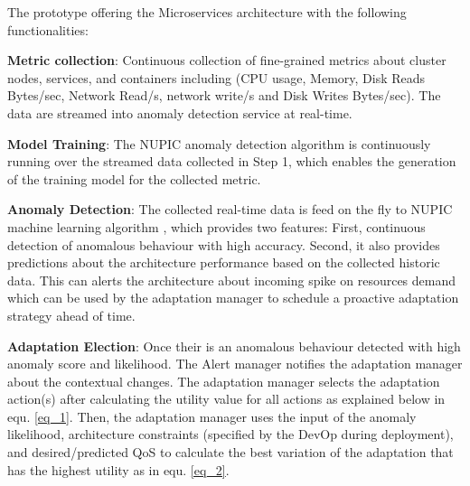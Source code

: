 \documentclass[sigconf]{acmart}
\begin{document}
The prototype offering the Microservices architecture with the following functionalities: 

\textbf{Metric collection}: Continuous collection of fine-grained metrics about cluster nodes, services, and containers including (CPU usage, Memory, Disk Reads Bytes/sec, Network Read/s, network write/s and Disk Writes Bytes/sec). The data are streamed into anomaly detection service at real-time. 

\textbf{Model Training}: The NUPIC anomaly detection algorithm is continuously running over the streamed data collected in Step 1, which enables the generation of the training model for the collected metric. 

\textbf{Anomaly Detection}: The collected real-time data is feed on the fly to NUPIC machine learning algorithm \cite{AHMAD2017134}, which provides two features: First, continuous detection of anomalous behaviour with high accuracy. Second, it also provides predictions about the architecture performance based on the collected historic data. This can alerts the architecture about incoming spike on resources demand which can be used by the adaptation manager to schedule a proactive adaptation strategy ahead of time. 

\textbf{Adaptation Election}: Once their is an anomalous behaviour detected with high anomaly score and likelihood. The Alert manager notifies the adaptation manager about the contextual changes. The adaptation manager selects the adaptation action(s) after calculating the utility value for all actions as explained below in equ. \ref{eq_1}. Then, the adaptation manager uses the input of the anomaly likelihood, architecture constraints (specified by the DevOp during deployment), and desired/predicted QoS to calculate the best variation of the adaptation that has the highest utility as in equ. \ref{eq_2}. 
\end{document}
